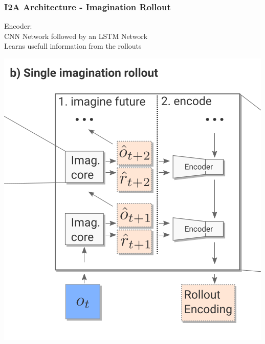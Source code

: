 \begin{frame}
    \frametitle{I2A Architecture - Imagination Rollout}

\begin{multicols}{2}
	\begin{PraesentationAufzaehlung}
		\item Encoder:\\
		CNN Network followed by an LSTM Network\\
		Learns usefull information from the rollouts
	\end{PraesentationAufzaehlung}
    \vfill\columnbreak
    \includegraphics[width=\columnwidth]{./Images/single_imagination_rollout.png}%
\end{multicols}
    
\end{frame}
\clearpage

